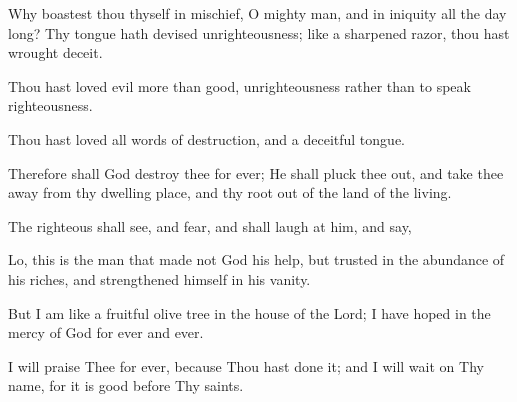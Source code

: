 Why boastest thou thyself in mischief, O mighty man, and in iniquity all the day long? Thy tongue hath devised unrighteousness; like a sharpened razor, thou hast wrought deceit.

Thou hast loved evil more than good, unrighteousness rather than to speak righteousness.

Thou hast loved all words of destruction, and a deceitful tongue.

Therefore shall God destroy thee for ever; He shall pluck thee out, and take thee away from thy dwelling place, and thy root out of the land of the living.

The righteous shall see, and fear, and shall laugh at him, and say,

Lo, this is the man that made not God his help, but trusted in the abundance of his riches, and strengthened himself in his vanity.

But I am like a fruitful olive tree in the house of the Lord; I have hoped in the mercy of God for ever and ever.

I will praise Thee for ever, because Thou hast done it; and I will wait on Thy name, for it is good before Thy saints.
